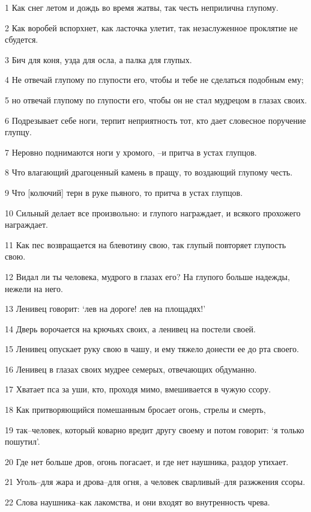 \par 1 Как снег летом и дождь во время жатвы, так честь неприлична глупому.
\par 2 Как воробей вспорхнет, как ласточка улетит, так незаслуженное проклятие не сбудется.
\par 3 Бич для коня, узда для осла, а палка для глупых.
\par 4 Не отвечай глупому по глупости его, чтобы и тебе не сделаться подобным ему;
\par 5 но отвечай глупому по глупости его, чтобы он не стал мудрецом в глазах своих.
\par 6 Подрезывает себе ноги, терпит неприятность тот, кто дает словесное поручение глупцу.
\par 7 Неровно поднимаются ноги у хромого, --и притча в устах глупцов.
\par 8 Что влагающий драгоценный камень в пращу, то воздающий глупому честь.
\par 9 Что [колючий] терн в руке пьяного, то притча в устах глупцов.
\par 10 Сильный делает все произвольно: и глупого награждает, и всякого прохожего награждает.
\par 11 Как пес возвращается на блевотину свою, так глупый повторяет глупость свою.
\par 12 Видал ли ты человека, мудрого в глазах его? На глупого больше надежды, нежели на него.
\par 13 Ленивец говорит: `лев на дороге! лев на площадях!'
\par 14 Дверь ворочается на крючьях своих, а ленивец на постели своей.
\par 15 Ленивец опускает руку свою в чашу, и ему тяжело донести ее до рта своего.
\par 16 Ленивец в глазах своих мудрее семерых, отвечающих обдуманно.
\par 17 Хватает пса за уши, кто, проходя мимо, вмешивается в чужую ссору.
\par 18 Как притворяющийся помешанным бросает огонь, стрелы и смерть,
\par 19 так--человек, который коварно вредит другу своему и потом говорит: `я только пошутил'.
\par 20 Где нет больше дров, огонь погасает, и где нет наушника, раздор утихает.
\par 21 Уголь--для жара и дрова--для огня, а человек сварливый--для разжжения ссоры.
\par 22 Слова наушника--как лакомства, и они входят во внутренность чрева.
